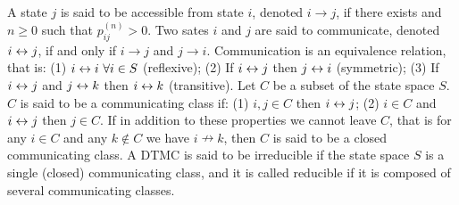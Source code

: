  A state $j$ is said to be accessible from state $i$, denoted $i \to j$, if there exists and $n \ge 0$ such that $p^{(n)}_{ij} > 0$.
 Two sates $i$ and $j$ are said to communicate, denoted $i \leftrightarrow j$, if and only if $i \to j$ and $j \to i$.
 Communication is an equivalence relation, that is: 
(1) $i \leftrightarrow i\ \forall i \in S$ (reflexive); 
(2) If $i \leftrightarrow j$ then $j \leftrightarrow i$ (symmetric); 
(3) If $i \leftrightarrow j$ and $j \leftrightarrow k$ then $i \leftrightarrow k$ (transitive).
 Let $C$ be a subset of the state space $S$. $C$ is said to be a communicating class if: 
(1) $i,j \in C$ then $i \leftrightarrow j$; 
(2) $i \in C$ and $i \leftrightarrow j$ then $j \in C$. 
If in addition to these properties we cannot leave $C$, that is for any $i \in C$ and any $k \notin C$ we have $i \nrightarrow k$, then $C$ is said to be a closed communicating class.
 A DTMC is said to be irreducible if the state space $S$ is a single (closed) communicating class, and it is called reducible if it is composed of several communicating classes.